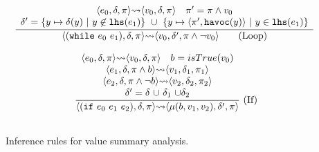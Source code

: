 \documentclass[conference, romanappendices]{tex/IEEEtran}
\theoremstyle{bfnote}
\newcommand{\valEnv}{\delta}
\newcommand{\pathEnv}{\pi}
\newcommand{\union}{\mu}
\newcommand{\irulelabel}[3]
{
\mkern-2mu
\begin{array}{ll}
\displaystyle\frac{#1}{\vphantom{,}#2} & \!\!\!\!#3
\end{array}
\mkern-2mu
}
\begin{document}
\begin{figure}[t]
\[\begin{array}{c}
\irulelabel
{\begin{array}{c}
	\langle e_0, \valEnv,\pathEnv \rangle {\leadsto} \langle v_0, \valEnv, \pathEnv \rangle  \quad  \pathEnv' = \pathEnv \land v_0 \\
    \valEnv' = \{ y \mapsto \valEnv(y) \ | \ y \not\in \mathtt{lhs}(e_1)\} \ \cup \ \{y \mapsto \langle \pathEnv',\mathtt{havoc}(y)\rangle \ | \ y \in \mathtt{lhs}(e_1) \} \\
\end{array}}
{\langle (\mathtt{while} \ e_0 \ e_1), \valEnv,\pathEnv \rangle {\leadsto} \langle v_0, \valEnv', \pathEnv \land \neg v_0 \rangle \hspace{20pt minus 1fill}\textrm{(Loop)}}
{} \\ \ \\

\irulelabel
{\begin{array}{c}
{\langle e_0, \valEnv,\pathEnv \rangle {\leadsto} \langle v_0, \valEnv, \pathEnv \rangle} \quad b=isTrue(v_0) \\
{\langle e_1, \valEnv,\pathEnv\land b \rangle {\leadsto} \langle v_1, \valEnv_1, \pathEnv_1 \rangle} \\
{\langle e_2, \valEnv,\pathEnv\land \neg b \rangle {\leadsto} \langle v_2, \valEnv_2, \pathEnv_2 \rangle} \\
{\valEnv' =  \valEnv \ {\cup} \ \valEnv_1 \ {\cup} \valEnv_2 } \\
\end{array}}
{\langle (\mathtt{if} \ e_0 \ e_1 \ e_2), \valEnv,\pathEnv \rangle {\leadsto} \langle \union(b, v_1,v_2), \valEnv', \pathEnv \rangle}
{\textrm{(If)}} \\ \ \\

\end{array}
\]
\vspace{-18pt}
\caption{\small Inference rules for value summary analysis.}
\label{fig:rules-value-sum}
\vspace{-7mm}
\end{figure}
\end{document}
